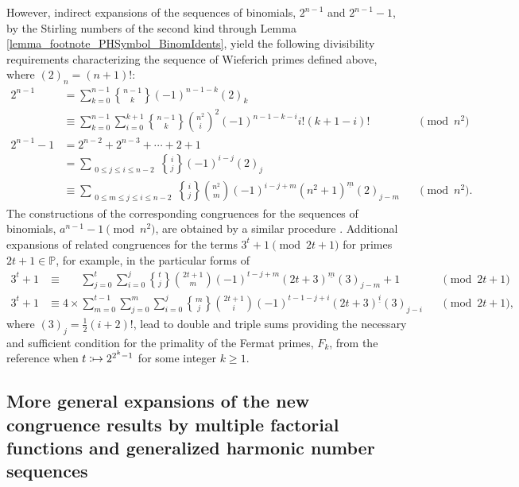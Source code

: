 \documentclass[12pt,reqno]{article}
\numberwithin{sfootnote}{section}
\numberwithin{equation}{section}
\theoremstyle{plain}
\theoremstyle{definition}
\theoremstyle{remark}
\newcommand{\cf}[0]{cf.\ }
\newcommand{\defmapsto}{\ensuremath{\vcentcolon\mapsto}}
\newcommand{\gkpSII}[2]{\ensuremath{\genfrac{\{}{\}}{0pt}{}{#1}{#2}}}
\newcommand{\FFactII}[2]{\ensuremath{#1^{\underline{#2}}}}
\newcommand{\Pochhammer}[2]{\ensuremath{\left(#1\right)_{#2}}}
\begin{document}
However, indirect expansions of the sequences of binomials, 
$2^{n-1}$ and $2^{n-1}-1$, by the 
Stirling numbers of the second kind through 
Lemma \ref{lemma_footnote_PHSymbol_BinomIdents}, yield the following 
divisibility requirements characterizing the sequence of 
Wieferich primes defined above, where $\Pochhammer{2}{n} = (n+1)!$: 
\begin{align*} 
2^{n-1} \phantom{-1} 
     & = 
     \sum_{k=0}^{n-1} \gkpSII{n-1}{k} (-1)^{n-1-k} \Pochhammer{2}{k} && \\ 
     & \equiv 
     \sum_{k=0}^{n-1} \sum_{i=0}^{k+1} 
     \gkpSII{n-1}{k} \binom{n^2}{i}^{2} (-1)^{n-1-k-i} i! (k+1-i)! && 
     \pmod{n^2} \\ 
2^{n-1}-1 
     & = 
     2^{n-2} + 2^{n-3} + \cdots + 2 + 1 && \\ 
     & = 
     \sum_{\substack{ 0 \leq j \leq i \leq n-2}} 
     \gkpSII{i}{j} (-1)^{i-j} \Pochhammer{2}{j} && \\ 
     & \equiv 
     \sum_{\substack{ 0 \leq m \leq j \leq i \leq n-2}} 
     \gkpSII{i}{j} \binom{n^2}{m} (-1)^{i-j+m} 
     \FFactII{(n^2+1)}{m} \Pochhammer{2}{j-m} && 
     \pmod{n^2}. 
\end{align*} 
The constructions of the corresponding congruences 
for the sequences of binomials, $a^{n-1} - 1 \pmod{n^2}$, are 
obtained by a similar procedure \citep[\cf \S 5.3; Table 45]{PRIMEREC}. 
Additional expansions of related congruences for the terms 
$3^{t} + 1 \pmod{2t+1}$ for primes $2t+1 \in \mathbb{P}$, 
for example, in the particular forms of 
\begin{align*} 
3^{t} + 1 
     & \equiv 
     \phantom{4 \times} 
     \sum_{j=0}^{t} \sum_{i=0}^{j} 
     \gkpSII{t}{j} \binom{2t+1}{m} (-1)^{t-j+m} 
     \FFactII{(2t+3)}{m} \Pochhammer{3}{j-m} + 1 && 
     \pmod{2t+1} \\ 
3^{t} + 1     
     & \equiv 
     4 \times \sum_{m=0}^{t-1} \sum_{j=0}^{m} \sum_{i=0}^{j} 
     \gkpSII{m}{j} \binom{2t+1}{i} (-1)^{t-1-j+i} 
     \FFactII{(2t+3)}{i} \Pochhammer{3}{j-i} && 
     \pmod{2t+1}, 
\end{align*} 
where $\Pochhammer{3}{j} = \frac{1}{2} (i+2)!$, 
lead to double and triple sums providing the necessary and sufficient 
condition for the primality of the Fermat primes, $F_k$, 
from the reference \citep[\S 6.14]{HARDYWRIGHTNUMT} 
when $t \defmapsto 2^{2^{k}-1}$ for some integer $k \geq 1$. 

\subsection{More general expansions of the new congruence results by 
            multiple factorial functions and 
            generalized harmonic number sequences} 
\label{subsubSection_MoreGeneralExps_congruences_multiple_factfns} 
\end{document}
